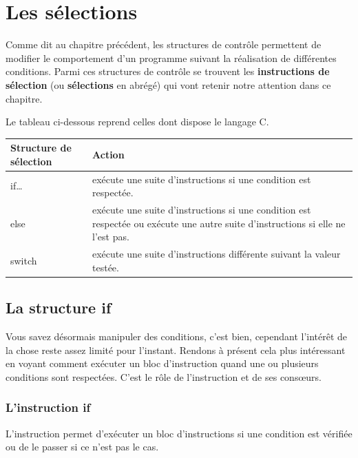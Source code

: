 \chapter{Les sélections}

Comme dit au chapitre précédent, les
structures de contrôle permettent de modifier le comportement d'un
programme suivant la réalisation de différentes conditions. Parmi ces
structures de contrôle se trouvent les \textbf{instructions de
sélection} (ou \textbf{sélections} en abrégé) qui vont retenir notre
attention dans ce chapitre.

Le tableau ci-dessous reprend celles dont dispose le langage C.

\begin{table}[ht!]
\centering
\begin{tabular}{|p{3cm}|p{12cm}|}\arrayrulecolor{gris-tab-entete}\hline
\rowcolor{gris-tab-entete}\textbf{Structure de sélection} & \textbf{Action}\tabularnewline\hline
\rowcolor{gris-clair-tab}if\ldots{} & exécute une suite d'instructions si une condition est respectée.\tabularnewline\hline
else & exécute une suite d'instructions si une condition est respectée ou exécute une autre suite d'instructions si elle ne l'est pas.\tabularnewline\hline
\rowcolor{gris-clair-tab}switch & exécute une suite d'instructions différente suivant la valeur testée.\tabularnewline\hline
\end{tabular}
\end{table}

\section{La structure if}
\label{la-structure-if}

Vous savez désormais manipuler des conditions, c'est bien, cependant
l'intérêt de la chose reste assez limité pour l'instant. Rendons à
présent cela plus intéressant en voyant comment exécuter un bloc
d'instruction quand une ou plusieurs conditions sont respectées. C'est
le rôle de l'instruction  et de ses cons\oe{}urs.

\subsection{L'instruction if}
\label{linstruction-if}

L'instruction  permet d'exécuter un bloc d'instructions si
une condition est vérifiée ou de le passer si ce n'est pas le cas.


